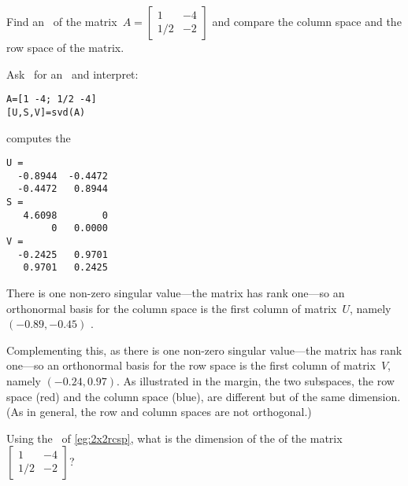 \begin{example} \label{eg:2x2rcsp}
Find an \svd\ of the matrix~\(A=\begin{bmatrix} 1&-4\\1/2&-2 \end{bmatrix}\) and compare the column space and the row space of the matrix.
\begin{solution} 
Ask \script\ for an \svd\ and interpret:
\begin{verbatim}
A=[1 -4; 1/2 -4]
[U,S,V]=svd(A)
\end{verbatim}
\setbox\ajrqrbox\hbox{}%
\marginpar{\usebox{\ajrqrbox}}%
computes the \svd\ 
\begin{verbatim}
U =
  -0.8944  -0.4472
  -0.4472   0.8944
S =
   4.6098        0
        0   0.0000
V =
  -0.2425   0.9701
   0.9701   0.2425
\end{verbatim}
There is one non-zero singular value---the matrix has rank one---so an orthonormal basis for the column space is the first column of matrix~\(U\), namely \((-0.89,-0.45)\) \twodp.

%
Complementing this, as there is one non-zero singular value---the matrix has rank one---so an orthonormal basis for the row space is the first column of matrix~\(V\), namely \((-0.24,0.97)\).
As illustrated in the margin, the two subspaces, the row space (red) and the column space (blue), are different but of the same dimension.
(As in general, the row and column spaces are not orthogonal.)
\end{solution}
\end{example}



\begin{activity}
Using the \svd\ of \autoref{eg:2x2rcsp}, what is the dimension of the  of the matrix~\(\begin{bmatrix} 1&-4\\1/2&-2 \end{bmatrix}\)?
\actposs[4]1230
\end{activity}


